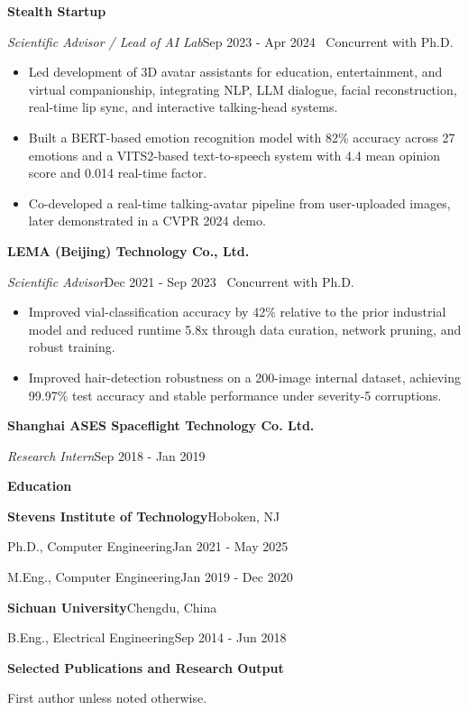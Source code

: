\documentclass[11pt]{article}
\newcommand{\sectiontitle}[1]{%
  \vspace{10pt}%
  {\large\sffamily\bfseries\color{heading} #1}\par
  \vspace{3pt}{\color{heading!55}\hrule}\vspace{6pt}
}
\newcommand{\company}[1]{\textbf{#1}\par}
\newcommand{\role}[2]{\emph{#1}\hfill{\small #2}\par}
\newcommand{\entryspace}{\vspace{5pt}}
\begin{document}
\entryspace
\company{Stealth Startup}
\role{Scientific Advisor / Lead of AI Lab}{Sep 2023 - Apr 2024 \textbar\ Concurrent with Ph.D.}
\begin{itemize}
    \item Led development of 3D avatar assistants for education, entertainment, and virtual companionship, integrating NLP, LLM dialogue, facial reconstruction, real-time lip sync, and interactive talking-head systems.
    \item Built a BERT-based emotion recognition model with 82\% accuracy across 27 emotions and a VITS2-based text-to-speech system with 4.4 mean opinion score and 0.014 real-time factor.
    \item Co-developed a real-time talking-avatar pipeline from user-uploaded images, later demonstrated in a CVPR 2024 demo.
\end{itemize}

\entryspace
\company{LEMA (Beijing) Technology Co., Ltd.}
\role{Scientific Advisor}{Dec 2021 - Sep 2023 \textbar\ Concurrent with Ph.D.}
\begin{itemize}
    \item Improved vial-classification accuracy by 42\% relative to the prior industrial model and reduced runtime 5.8x through data curation, network pruning, and robust training.
    \item Improved hair-detection robustness on a 200-image internal dataset, achieving 99.97\% test accuracy and stable performance under severity-5 corruptions.
\end{itemize}

\entryspace
\company{Shanghai ASES Spaceflight Technology Co. Ltd.}
\role{Research Intern}{Sep 2018 - Jan 2019}

\sectiontitle{Education}

\textbf{Stevens Institute of Technology}\hfill{\small Hoboken, NJ}\par
Ph.D., Computer Engineering\hfill{\small Jan 2021 - May 2025}\par
M.Eng., Computer Engineering\hfill{\small Jan 2019 - Dec 2020}\par

\entryspace
\textbf{Sichuan University}\hfill{\small Chengdu, China}\par
B.Eng., Electrical Engineering\hfill{\small Sep 2014 - Jun 2018}\par

\sectiontitle{Selected Publications and Research Output}
{\small\color{muted}First author unless noted otherwise.}\par\vspace{4pt}
\end{document}
